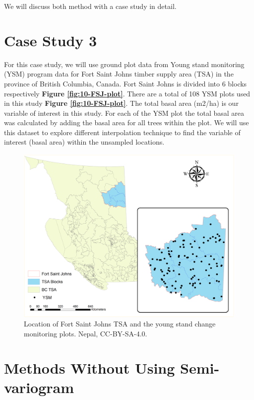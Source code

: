 \documentclass[
]{book}
\begin{document}
We will discuss both method with a case study in detail.

\hypertarget{case-study-3}{%
\section{Case Study 3}\label{case-study-3}}

For this case study, we will use ground plot data from Young stand monitoring (YSM) program data \citep{province_of_bc_provincial_2018} for Fort Saint Johns timber supply area (TSA) in the province of British Columbia, Canada. Fort Saint Johns is divided into 6 blocks respectively \textbf{Figure \ref{fig:10-FSJ-plot}}. There are a total of 108 YSM plots used in this study \textbf{Figure \ref{fig:10-FSJ-plot}}. The total basal area (m2/ha) is our variable of interest in this study. For each of the YSM plot the total basal area was calculated by adding the basal area for all trees within the plot. We will use this dataset to explore different interpolation technique to find the variable of interest (basal area) within the unsampled locations.

\begin{figure}
\includegraphics[width=45.83in]{images/10-FSJ-plot} \caption{ Location of Fort Saint Johns TSA and the young stand change monitoring plots. Nepal, CC-BY-SA-4.0.}\label{fig:10-FSJ-plot1}
\end{figure}

\hypertarget{methods-without-using-semi-variogram}{%
\section{Methods Without Using Semi-variogram}\label{methods-without-using-semi-variogram}}
\end{document}
